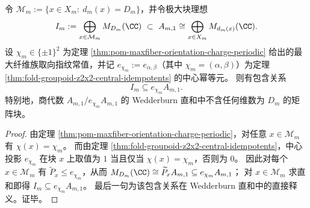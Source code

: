\begin{proposition}\label{prop:fold-groupoid-maxblock-chi-homogeneity}
令 \(\mathcal{M}_m:=\{x\in X_m:\ d_m(x)=D_m\}\)，并令极大块理想
\[
I_m:=\bigoplus_{x\in\mathcal{M}_m}M_{D_m}(\CC)\ \subset\ A_{m,1}\cong\bigoplus_{x\in X_m}M_{d_m(x)}(\CC).
\]
设 \(\chi_m\in\{\pm1\}^2\) 为定理 \ref{thm:pom-maxfiber-orientation-charge-periodic} 给出的最大纤维族取向指纹常值，并记 \(e_{\chi_m}:=e_{\alpha,\beta}\)（其中 \(\chi_m=(\alpha,\beta)\)）为定理 \ref{thm:fold-groupoid-z2x2-central-idempotents} 的中心幂等元。
则有包含关系
\[
\boxed{\;I_m\subseteq e_{\chi_m}A_{m,1}.\;}
\]
特别地，商代数 \(A_{m,1}/e_{\chi_m}A_{m,1}\) 的 Wedderburn 直和中不含任何维数为 \(D_m\) 的矩阵块。
\end{proposition}
\begin{proof}
由定理 \ref{thm:pom-maxfiber-orientation-charge-periodic}，对任意 \(x\in\mathcal{M}_m\) 有 \(\chi(x)=\chi_m\)。
而由定理 \ref{thm:fold-groupoid-z2x2-central-idempotents}，中心投影 \(e_{\chi_m}\) 在块 \(x\) 上取值为 \(1\) 当且仅当 \(\chi(x)=\chi_m\)，否则为 \(0\)。
因此对每个 \(x\in\mathcal{M}_m\) 有 \(\widetilde P_x\le e_{\chi_m}\)，从而
\(
M_{D_m}(\CC)\cong \widetilde P_xA_{m,1}\subseteq e_{\chi_m}A_{m,1}
\)；
对 \(x\in\mathcal{M}_m\) 求直和即得 \(I_m\subseteq e_{\chi_m}A_{m,1}\)。
最后一句为该包含关系在 Wedderburn 直和中的直接释义。证毕。
\end{proof}

